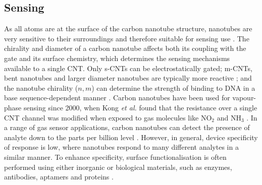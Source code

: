 \documentclass[
  a4paper,
]{scrbook}
\begin{document}
\hypertarget{sec-CNT-sensing-mechanisms}{%
\subsection{Sensing}\label{sec-CNT-sensing-mechanisms}}

As all atoms are at the surface of the carbon nanotube structure,
nanotubes are very sensitive to their surroundings and therefore
suitable for sensing use \autocite{Cao2009,Yao2021,Shkodra2021}. The
chirality and diameter of a carbon nanotube affects both its coupling
with the gate and its surface chemistry, which determines the sensing
mechanisms available to a single CNT. Only s-CNTs can be
electrostatically gated; m-CNTs, bent nanotubes and larger diameter
nanotubes are typically more reactive
\autocite{Cao2009,Zhao2012,Chhikara2013,Li2023}; and the nanotube
chirality (\(n,m\)) can determine the strength of binding to DNA in a
base sequence-dependent manner \autocite{Rouhi2011a}. Carbon nanotubes
have been used for vapour-phase sensing since 2000, when Kong \emph{et
al.} found that the resistance over a single CNT channel was modified
when exposed to gas molecules like NO\(_2\) and NH\(_3\)
\autocite{Kong2000}. In a range of gas sensor applications, carbon
nanotubes can detect the presence of analyte down to the parts per
billion level \autocite{Chen2019,Yao2021}. However, in general, device
specificity of response is low, where nanotubes respond to many
different analytes in a similar manner. To enhance specificity, surface
functionalisation is often performed using either inorganic or
biological materials, such as enzymes, antibodies, aptamers and proteins
\autocite{Cao2009,Shkodra2021,Yao2021}.
\end{document}
